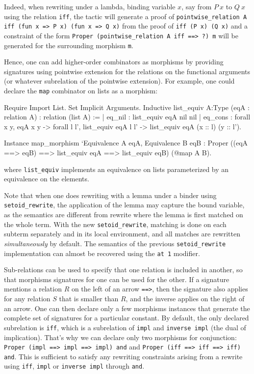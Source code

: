 Indeed, when rewriting under a lambda, binding variable $x$, say from
$P~x$ to $Q~x$ using the relation \texttt{iff}, the tactic will generate
a proof of \texttt{pointwise\_relation A iff (fun x => P x) (fun x => Q
x)} from the proof of \texttt{iff (P x) (Q x)} and a constraint of the
form \texttt{Proper (pointwise\_relation A iff ==> ?) m} will be
generated for the surrounding morphism \texttt{m}.

Hence, one can add higher-order combinators as morphisms by providing
signatures using pointwise extension for the relations on the functional
arguments (or whatever subrelation of the pointwise extension).
For example, one could declare the \texttt{map} combinator on lists as 
a morphism:
\begin{coq_eval}
Require Import List.
Set Implicit Arguments.
Inductive list_equiv {A:Type} (eqA : relation A) : relation (list A) :=
| eq_nil : list_equiv eqA nil nil
| eq_cons : forall x y, eqA x y -> 
  forall l l', list_equiv eqA l l' -> list_equiv eqA (x :: l) (y :: l').
\end{coq_eval}
\begin{coq_example*}
Instance map_morphism `{Equivalence A eqA, Equivalence B eqB} :
  Proper ((eqA ==> eqB) ==> list_equiv eqA ==> list_equiv eqB) 
     (@map A B).
\end{coq_example*}

where \texttt{list\_equiv} implements an equivalence on lists
parameterized by an equivalence on the elements.

Note that when one does rewriting with a lemma under a binder
using \texttt{setoid\_rewrite}, the application of the lemma may capture
the bound variable, as the semantics are different from rewrite where
the lemma is first matched on the whole term. With the new
\texttt{setoid\_rewrite}, matching is done on each subterm separately
and in its local environment, and all matches are rewritten
\emph{simultaneously} by default. The semantics of the previous
\texttt{setoid\_rewrite} implementation can almost be recovered using
the \texttt{at 1} modifier.


Sub-relations can be used to specify that one relation is included in
another, so that morphisms signatures for one can be used for the other.
If a signature mentions a relation $R$ on the left of an arrow
\texttt{==>}, then the signature also applies for any relation $S$ that
is smaller than $R$, and the inverse applies on the right of an arrow. 
One can then declare only a few morphisms instances that generate the complete set
of signatures for a particular constant. By default, the only declared
subrelation is \texttt{iff}, which is a subrelation of \texttt{impl}
and \texttt{inverse impl} (the dual of implication). That's why we can
declare only two morphisms for conjunction:
\texttt{Proper (impl ==> impl ==> impl) and} and 
\texttt{Proper (iff ==> iff ==> iff) and}. This is sufficient to satisfy
any rewriting constraints arising from a rewrite using \texttt{iff},
\texttt{impl} or \texttt{inverse impl} through \texttt{and}.


